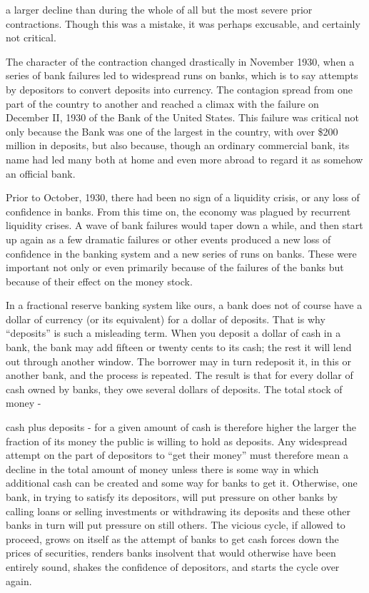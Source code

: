 \documentclass[11pt,openany]{book}
\begin{document}
a larger decline than during the whole of all but the most severe prior contractions. Though this was a mistake, it was perhaps excusable, and certainly not critical.

The character of the contraction changed drastically in November 1930, when a series of bank failures led to widespread runs on banks, which is to say attempts by depositors to convert deposits into currency. The contagion spread from one part of the country to another and reached a climax with the failure on December II, 1930 of the Bank of the United States. This failure was critical not only because the Bank was one of the largest in the country, with over \$200 million in deposits, but also because, though an ordinary commercial bank, its name had led many both at home and even more abroad to regard it as somehow an official bank.

Prior to October, 1930, there had been no sign of a liquidity crisis, or any loss of confidence in banks. From this time on, the economy was plagued by recurrent liquidity crises. A wave of bank failures would taper down a while, and then start up again as a few dramatic failures or other events produced a new loss of confidence in the banking system and a new series of runs on banks. These were important not only or even primarily because of the failures of the banks but because of their effect on the money stock.

In a fractional reserve banking system like ours, a bank does not of course have a dollar of currency (or its equivalent) for a dollar of deposits. That is why ``deposits'' is such a misleading term. When you deposit a dollar of cash in a bank, the bank may add fifteen or twenty cents to its cash; the rest it will lend out through another window. The borrower may in turn redeposit it, in this or another bank, and the process is repeated. The result is that for every dollar of cash owned by banks, they owe several dollars of deposits. The total stock of money -

cash plus deposits - for a given amount of cash is therefore higher the larger the fraction of its money the public is willing to hold as deposits. Any widespread attempt on the part of depositors to ``get their money'' must therefore mean a decline in the total amount of money unless there is some way in which additional cash can be created and some way for banks to get it. Otherwise, one bank, in trying to satisfy its depositors, will put pressure on other banks by calling loans or selling investments or withdrawing its deposits and these other banks in turn will put pressure on still others. The vicious cycle, if allowed to proceed, grows on itself as the attempt of banks to get cash forces down the prices of securities, renders banks insolvent that would otherwise have been entirely sound, shakes the confidence of depositors, and starts the cycle over again.
\end{document}
